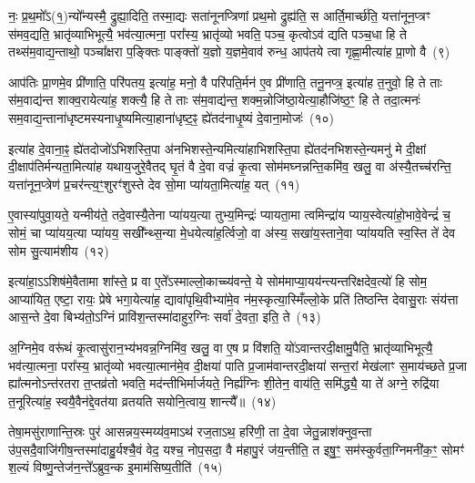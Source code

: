 नः॒ प्र॒थ॒मो᳚\-ऽ(१॒)न्यो᳚न्यस्मै॒ द्रुह्या॒दिति॒ तस्मा॒द्यः सता॑नूनप्त्रिणां प्रथ॒मो द्रुह्य॑ति॒ स आर्ति॒मार्च्छ॑ति॒ यत्ता॑नून॒प्त्रꣳ स॑मव॒द्यति॒ भ्रातृ॑व्याभिभूत्यै॒ भव॑त्या॒त्मना॒ परा᳚स्य॒ भ्रातृ॑व्यो भवति॒ पञ्च॒ कृत्वो\-ऽव॑ द्यति पञ्च॒धा हि ते तथ्स॑म॒वाद्य॒न्ताथो॒ पञ्चा᳚क्षरा प॒ङ्क्तिः पाङ्क्तो॑ य॒ज्ञो य॒ज्ञमे॒वाव॑ रुन्ध॒ आप॑तये त्वा गृह्णा॒मीत्या॑ह प्रा॒णो वै~(९)

आप॑तिः प्रा॒णमे॒व प्री॑णाति॒ परि॑पतय॒ इत्या॑ह॒ मनो॒ वै परि॑पति॒र्मन॑ ए॒व प्री॑णाति॒ तनू॒नप्त्र॒ इत्या॑ह त॒नुवो॒ हि ते ताः स॑म॒वाद्य॑न्त शाक्व॒रायेत्या॑ह॒ शक्त्यै॒ हि ते ताः स॑म॒वाद्य॑न्त॒ शक्म॒न्नोजि॑ष्ठा॒येत्या॒हौजि॑ष्ठ॒ꣳ॒ हि ते तदा॒त्मनः॑ सम॒वाद्य॒न्ताना॑धृष्टमस्यनाधृ॒ष्यमित्या॒हाना॑धृष्ट॒ꣴ॒ ह्ये॑तद॑नाधृ॒ष्यं दे॒वाना॒मोजः॑~(१०)

इत्या॑ह दे॒वाना॒ꣴ॒ ह्ये॑तदोजो॑\-ऽभिशस्ति॒पा अ॑नभिशस्ते॒न्यमित्या॑हाभिशस्ति॒पा ह्ये॑तद॑नभिशस्ते॒न्यमनु॑ मे दी॒क्षां दी॒क्षाप॑तिर्मन्यता॒मित्या॑ह यथाय॒जुरे॒वैतद् घृ॒तं वै दे॒वा वज्रं॑ कृ॒त्वा सोम॑मघ्नन्नन्ति॒कमि॑व॒ खलु॒ वा अ॑स्यै॒तच्च॑रन्ति॒ यत्ता॑नून॒प्त्रेण॑ प्र॒चर॑न्त्य॒ꣳ॒शुरꣳ॑शुस्ते देव सो॒मा प्या॑यता॒मित्या॑ह॒ यत्~(११)

ए॒वास्या॑पुवा॒यते॒ यन्मीय॑ते॒ तदे॒वास्यै॒तेना प्या॑यय॒त्या तुभ्य॒मिन्द्रः॑ प्यायता॒मा त्वमिन्द्रा॑य प्याय॒स्वेत्या॑हो॒भावे॒वेन्द्रं॑ च॒ सोमं॒ चा प्या॑यय॒त्या प्या॑यय॒ सखी᳚न्थ्स॒न्या मे॒धयेत्या॑ह॒र्त्विजो॒ वा अ॑स्य॒ सखा॑य॒स्ताने॒वा प्या॑ययति स्व॒स्ति ते॑ देव सोम सु॒त्याम॑शीय~(१२)

इत्या॑हा॒\-ऽऽ\-शिष॑मे॒वैतामा शा᳚स्ते॒ प्र वा ए॒ते᳚\-ऽस्माल्लो॒काच्च्य॑वन्ते॒ ये सोम॑माप्या॒यय॑न्त्यन्तरिक्षदेव॒त्यो॑ हि सोम॒ आप्या॑यित॒ एष्टा॒ रायः॒ प्रेषे भगा॒येत्या॑ह॒ द्यावा॑\-पृथि॒वीभ्या॑मे॒व न॑म॒स्कृत्या॒स्मिँल्लो॒के प्रति॑ तिष्ठन्ति देवासु॒राः संय॑त्ता आस॒न्ते दे॒वा बिभ्य॑तो॒\-ऽग्निं प्रावि॑श॒न्तस्मा॑दाहुर॒ग्निः सर्वा॑ दे॒वता॒ इति॒ ते~(१३)

अ॒ग्निमे॒व वरू॑थं कृ॒त्वासु॑रान॒भ्य॑भवन्न॒ग्निमि॑व॒ खलु॒ वा ए॒ष प्र वि॑शति॒ यो॑\-ऽवान्तरदी॒क्षामु॒पैति॒ भ्रातृ॑व्याभिभूत्यै॒ भव॑त्या॒त्मना॒ परा᳚स्य॒ भ्रातृ॑व्यो भवत्या॒त्मान॑मे॒व दी॒क्षया॑ पाति प्र॒जाम॑वान्तरदी॒क्षया॑ सन्त॒रां मेख॑लाꣳ स॒माय॑च्छते प्र॒जा ह्या᳚त्मनो\-ऽन्त॑रतरा त॒प्तव्र॑तो भवति॒ मद॑न्तीभिर्मार्जयते॒ निर्\mbox{}ह्य॑ग्निः शी॒तेन॒ वाय॑ति॒ समि॑द्ध्यै॒ या ते॑ अग्ने॒ रुद्रि॑या त॒नूरित्या॑ह॒ स्वयै॒वैन॑द्दे॒वत॑या व्रतयति सयोनि॒त्वाय॒ शान्त्यै᳚॥~(१४)

{\anuvakamend[{यो वा ओज॑ आह॒ यद॑शी॒येति॒ ते᳚\-ऽग्न॒ एका॑\-दश च}]}%

तेषा॒मसु॑राणान्ति॒स्रः पुर॑ आसन्नय॒स्मय्य॑व॒मा\-ऽथ॑ रज॒ता\-ऽथ॒ हरि॑णी॒ ता दे॒वा जेतु॒न्नाश॑क्नुव॒न्ता उ॑प॒सदै॒वाजि॑गीष॒न्तस्मा॑दाहु॒र्यश्चै॒वं वेद॒ यश्च॒ नोप॒सदा॒ वै म॑हापु॒रं ज॑य॒न्तीति॒ त इषु॒ꣳ॒ सम॑स्कुर्वता॒ग्निमनी॑क॒ꣳ॒ सोमꣳ॑ श॒ल्यं विष्णु॒न्तेज॑न॒न्ते᳚\-ऽब्रुव॒न्क इ॒माम॑सिष्य॒तीति॑~(१५)

